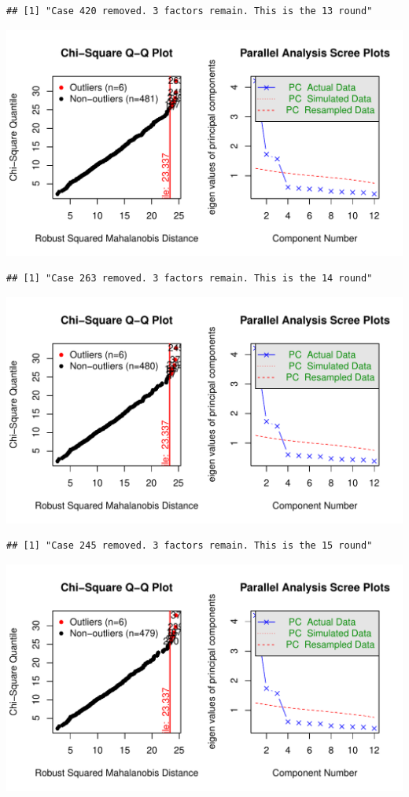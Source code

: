 \documentclass{article}\usepackage[]{graphicx}\usepackage[]{color}
\makeatletter
\def\maxwidth{ %
  \ifdim\Gin@nat@width>\linewidth
    \linewidth
  \else
    \Gin@nat@width
  \fi
}
\newenvironment{kframe}{%
 \def\at@end@of@kframe{}%
 \ifinner\ifhmode%
  \def\at@end@of@kframe{\end{minipage}}%
  \begin{minipage}{\columnwidth}%
 \fi\fi%
 \def\FrameCommand##1{\hskip\@totalleftmargin \hskip-\fboxsep
 \colorbox{shadecolor}{##1}\hskip-\fboxsep
     \hskip-\linewidth \hskip-\@totalleftmargin \hskip\columnwidth}%
 \MakeFramed {\advance\hsize-\width
   \@totalleftmargin\z@ \linewidth\hsize
   \@setminipage}}%
 {\par\unskip\endMakeFramed%
 \at@end@of@kframe}
\newenvironment{knitrout}{}{} %
\makeatother
\begin{document}
\begin{knitrout}
\begin{kframe}\begin{verbatim}
## [1] "Case 420 removed. 3 factors remain. This is the 13 round"
\end{verbatim}
\end{kframe}
\includegraphics[width=\maxwidth]{figure/unnamed-chunk-10-14} 
\begin{kframe}\begin{verbatim}
## [1] "Case 263 removed. 3 factors remain. This is the 14 round"
\end{verbatim}
\end{kframe}
\includegraphics[width=\maxwidth]{figure/unnamed-chunk-10-15} 
\begin{kframe}\begin{verbatim}
## [1] "Case 245 removed. 3 factors remain. This is the 15 round"
\end{verbatim}
\end{kframe}
\includegraphics[width=\maxwidth]{figure/unnamed-chunk-10-16} 

\end{knitrout}
\end{document}
